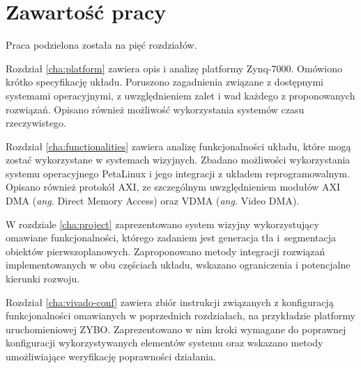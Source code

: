 \section{Zawartość pracy}

Praca podzielona została na pięć rozdziałów.

Rozdział \ref{cha:platform} zawiera opis i analizę platformy Zynq-7000. Omówiono krótko specyfikację układu. Poruszono zagadnienia związane z dostępnymi systemami operacyjnymi, z uwzględnieniem zalet i wad każdego z proponowanych rozwiązań. Opisano również możliwość wykorzystania systemów czasu rzeczywistego.

Rozdział \ref{cha:functionalities} zawiera analizę funkcjonalności układu, które mogą zostać wykorzystane w systemach wizyjnych. Zbadano możliwości wykorzystania systemu operacyjnego PetaLinux i jego integracji z układem reprogramowalnym. Opisano również protokół AXI, ze szczególnym uwzględnieniem modułów AXI DMA (\emph{ang.} Direct Memory Access) oraz VDMA (\emph{ang.} Video DMA).

W rozdziale \ref{cha:project} zaprezentowano system wizyjny wykorzystujący omawiane funkcjonalności, którego zadaniem jest generacja tła i~segmentacja obiektów pierwszoplanowych. Zaproponowano metody integracji rozwiązań implementowanych w obu częściach układu, wskazano ograniczenia i potencjalne kierunki rozwoju.

Rozdział \ref{cha:vivado-conf} zawiera zbiór instrukcji związanych z konfiguracją funkcjonalności omawianych w poprzednich rozdziałach, na przykładzie platformy uruchomieniowej ZYBO. Zaprezentowano w nim kroki wymagane do poprawnej konfiguracji wykorzystywanych elementów systemu oraz wskazano metody umożliwiające weryfikację poprawności działania.

